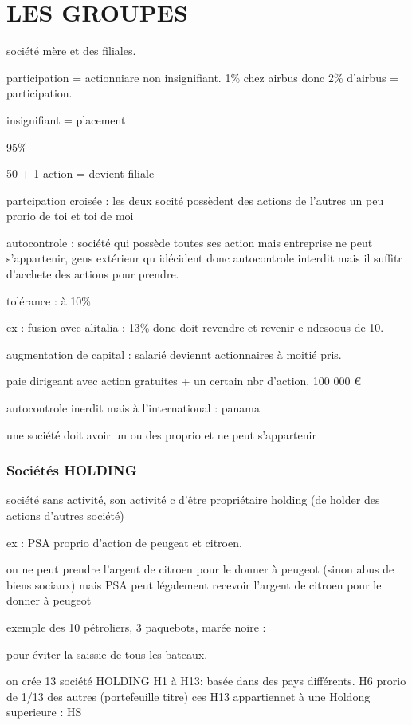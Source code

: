 \documentclass[a4paper,12pt]{article}
\begin{document}
\section{LES GROUPES}

société mère et des filiales.

participation = actionniare non insignifiant.  1\% chez airbus
donc 2\% d'airbus = participation. 

insignifiant = placement

95\%

50 + 1 action = devient filiale

partcipation croisée : les  deux socité possèdent des actions de l'autres
un peu prorio de toi et toi de moi



autocontrole : société qui possède toutes ses action
mais entreprise ne peut s'appartenir, gens extérieur qu idécident
donc autocontrole interdit mais il suffitr d'acchete des actions pour prendre.


tolérance : à 10\%

ex : fusion avec alitalia : 13\%  donc doit revendre et revenir e ndesoous de 10.

augmentation de capital : salarié deviennt actionnaires à moitié pris.

paie dirigeant avec action gratuites + un certain nbr d'action.
100 000 €

autocontrole inerdit mais à l'international : panama

une société doit avoir un ou des proprio et ne peut s'appartenir 

\subsubsection{Sociétés HOLDING} 

société sans activité, son activité c d'être propriétaire holding (de holder des actions d'autres société)

ex : PSA proprio d'action de peugeat et citroen.

on ne peut prendre l'argent de citroen pour le donner à peugeot (sinon abus de biens sociaux)  mais PSA peut légalement recevoir l'argent de citroen pour le donner à peugeot


exemple des 10 pétroliers, 3 paquebots, marée noire :

pour éviter la saissie  de tous les bateaux.

on crée 13 société HOLDING H1 à H13: basée dans des pays différents.
H6 prorio de 1/13 des autres (portefeuille titre)
ces H13 appartiennet à une Holdong superieure : HS
\end{document}

